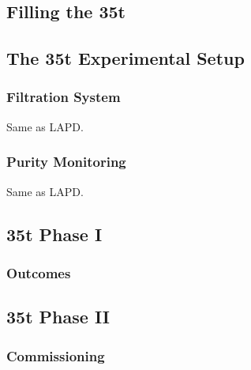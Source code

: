 \subsection{Filling the 35t}\label{sec:35tFilling}

\subsection{The 35t Experimental Setup}\label{sec:35tExperiment}

\subsubsection{Filtration System}\label{sec:35tFiltration}

Same as LAPD.

\subsubsection{Purity Monitoring}\label{sec:35tPurity}

Same as LAPD.

\subsection{35t Phase I}\label{sec:35tPhaseI}

\subsubsection{Outcomes}\label{sec:35tPhaseIOutcomes}

\subsection{35t Phase II}\label{sec:35tPhaseII}

\subsubsection{Commissioning}\label{sec:35tCommissioning}

